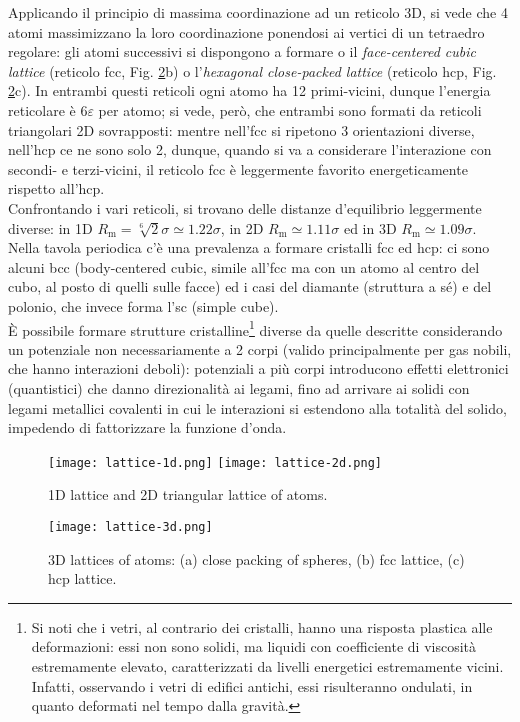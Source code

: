 Applicando il principio di massima coordinazione ad un reticolo 3D, si vede che 4 atomi massimizzano la loro coordinazione ponendosi ai vertici di un tetraedro regolare: gli atomi successivi si dispongono a formare o il \textit{face-centered cubic lattice} (reticolo fcc, Fig. \ref{lat-3}b) o l'\textit{hexagonal close-packed lattice} (reticolo hcp, Fig. \ref{lat-3}c). In entrambi questi reticoli ogni atomo ha 12 primi-vicini, dunque l'energia reticolare è $ 6\varepsilon $ per atomo; si vede, però, che entrambi sono formati da reticoli triangolari 2D sovrapposti: mentre nell'fcc si ripetono 3 orientazioni diverse, nell'hcp ce ne sono solo 2, dunque, quando si va a considerare l'interazione con secondi- e terzi-vicini, il reticolo fcc è leggermente favorito energeticamente rispetto all'hcp. \\
Confrontando i vari reticoli, si trovano delle distanze d'equilibrio leggermente diverse: in 1D $ R_\text{m} = \sqrt[6]{2} \sigma \simeq 1.22 \sigma $, in 2D $ R_\text{m} \simeq 1.11 \sigma $ ed in 3D $ R_\text{m} \simeq 1.09 \sigma $. Nella tavola periodica c'è una prevalenza a formare cristalli fcc ed hcp: ci sono alcuni bcc (body-centered cubic, simile all'fcc ma con un atomo al centro del cubo, al posto di quelli sulle facce) ed i casi del diamante (struttura a sé) e del polonio, che invece forma l'sc (simple cube). \\
È possibile formare strutture cristalline\footnote{Si noti che i vetri, al contrario dei cristalli, hanno una risposta plastica alle deformazioni: essi non sono solidi, ma liquidi con coefficiente di viscosità estremamente elevato, caratterizzati da livelli energetici estremamente vicini. Infatti, osservando i vetri di edifici antichi, essi risulteranno ondulati, in quanto deformati nel tempo dalla gravità.} diverse da quelle descritte considerando un potenziale non necessariamente a 2 corpi (valido principalmente per gas nobili, che hanno interazioni deboli): potenziali a più corpi introducono effetti elettronici (quantistici) che danno direzionalità ai legami, fino ad arrivare ai solidi con legami metallici covalenti in cui le interazioni si estendono alla totalità del solido, impedendo di fattorizzare la funzione d'onda.

\begin{figure}[!h]
	\centering
	\texttt{[image: lattice-1d.png]}
	\qquad
	\texttt{[image: lattice-2d.png]}
	\caption{1D lattice and 2D triangular lattice of atoms.}
	\label{lat-2}
\end{figure}
\begin{figure}[!h]
	\centering
	\texttt{[image: lattice-3d.png]}
	\caption{3D lattices of atoms: (a) close packing of spheres, (b) fcc lattice, (c) hcp lattice.}
	\label{lat-3}
\end{figure}

